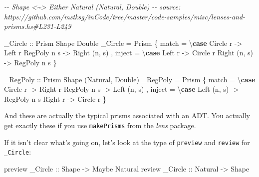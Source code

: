 \documentclass[]{article}
\newenvironment{Shaded}{}{}
\newcommand{\CommentTok}[1]{\textcolor[rgb]{0.38,0.63,0.69}{\textit{#1}}}
\newcommand{\DataTypeTok}[1]{\textcolor[rgb]{0.56,0.13,0.00}{#1}}
\newcommand{\KeywordTok}[1]{\textcolor[rgb]{0.00,0.44,0.13}{\textbf{#1}}}
\newcommand{\NormalTok}[1]{#1}
\newcommand{\OtherTok}[1]{\textcolor[rgb]{0.00,0.44,0.13}{#1}}
\begin{document}
\begin{Shaded}
\begin{Highlighting}[]
\CommentTok{{-}{-} Shape <\textasciitilde{}> Either Natural (Natural, Double)}
\CommentTok{{-}{-} source: https://github.com/mstksg/inCode/tree/master/code{-}samples/misc/lenses{-}and{-}prisms.hs\#L231{-}L249}

\OtherTok{\_Circle ::} \DataTypeTok{Prism\textquotesingle{}} \DataTypeTok{Shape} \DataTypeTok{Double}
\NormalTok{\_Circle }\OtherTok{=} \DataTypeTok{Prism\textquotesingle{}}
\NormalTok{    \{ match  }\OtherTok{=}\NormalTok{ \textbackslash{}}\KeywordTok{case}
        \DataTypeTok{Circle}\NormalTok{  r    }\OtherTok{{-}>} \DataTypeTok{Left}\NormalTok{ r}
        \DataTypeTok{RegPoly}\NormalTok{ n s  }\OtherTok{{-}>} \DataTypeTok{Right}\NormalTok{ (n, s)}
\NormalTok{    , inject }\OtherTok{=}\NormalTok{ \textbackslash{}}\KeywordTok{case}
        \DataTypeTok{Left}\NormalTok{   r     }\OtherTok{{-}>} \DataTypeTok{Circle}\NormalTok{ r}
        \DataTypeTok{Right}\NormalTok{ (n, s) }\OtherTok{{-}>} \DataTypeTok{RegPoly}\NormalTok{ n s}
\NormalTok{    \}}

\OtherTok{\_RegPoly ::} \DataTypeTok{Prism\textquotesingle{}} \DataTypeTok{Shape}\NormalTok{ (}\DataTypeTok{Natural}\NormalTok{, }\DataTypeTok{Double}\NormalTok{)}
\NormalTok{\_RegPoly }\OtherTok{=} \DataTypeTok{Prism\textquotesingle{}}
\NormalTok{    \{ match  }\OtherTok{=}\NormalTok{ \textbackslash{}}\KeywordTok{case}
        \DataTypeTok{Circle}\NormalTok{  r    }\OtherTok{{-}>} \DataTypeTok{Right}\NormalTok{ r}
        \DataTypeTok{RegPoly}\NormalTok{ n s  }\OtherTok{{-}>} \DataTypeTok{Left}\NormalTok{ (n, s)}
\NormalTok{    , inject }\OtherTok{=}\NormalTok{ \textbackslash{}}\KeywordTok{case}
        \DataTypeTok{Left}\NormalTok{  (n, s) }\OtherTok{{-}>} \DataTypeTok{RegPoly}\NormalTok{ n s}
        \DataTypeTok{Right}\NormalTok{  r     }\OtherTok{{-}>} \DataTypeTok{Circle}\NormalTok{ r}
\NormalTok{    \}}
\end{Highlighting}
\end{Shaded}

And these are actually the typical prisms associated with an ADT. You actually
get exactly these if you use \texttt{makePrisms} from the \emph{lens} package.

If it isn't clear what's going on, let's look at the type of \texttt{preview}
and \texttt{review} for \texttt{\_Circle}:

\begin{Shaded}
\begin{Highlighting}[]
\NormalTok{preview}\OtherTok{ \_Circle ::} \DataTypeTok{Shape}   \OtherTok{{-}>} \DataTypeTok{Maybe} \DataTypeTok{Natural}
\NormalTok{review}\OtherTok{  \_Circle ::} \DataTypeTok{Natural} \OtherTok{{-}>} \DataTypeTok{Shape}
\end{Highlighting}
\end{Shaded}
\end{document}
